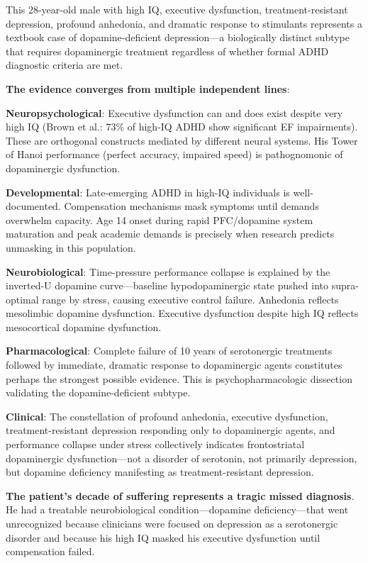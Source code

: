 This 28-year-old male with high IQ, executive dysfunction, treatment-resistant depression, profound anhedonia, and dramatic response to stimulants represents a textbook case of dopamine-deficient depression---a biologically distinct subtype that requires dopaminergic treatment regardless of whether formal ADHD diagnostic criteria are met.

\textbf{The evidence converges from multiple independent lines}:

\textbf{Neuropsychological}: Executive dysfunction can and does exist despite very high IQ (Brown et al.: 73\% of high-IQ ADHD show significant EF impairments). These are orthogonal constructs mediated by different neural systems. His Tower of Hanoi performance (perfect accuracy, impaired speed) is pathognomonic of dopaminergic dysfunction.

\textbf{Developmental}: Late-emerging ADHD in high-IQ individuals is well-documented. Compensation mechanisms mask symptoms until demands overwhelm capacity. Age 14 onset during rapid PFC/dopamine system maturation and peak academic demands is precisely when research predicts unmasking in this population.

\textbf{Neurobiological}: Time-pressure performance collapse is explained by the inverted-U dopamine curve---baseline hypodopaminergic state pushed into supra-optimal range by stress, causing executive control failure. Anhedonia reflects mesolimbic dopamine dysfunction. Executive dysfunction despite high IQ reflects mesocortical dopamine dysfunction.

\textbf{Pharmacological}: Complete failure of 10 years of serotonergic treatments followed by immediate, dramatic response to dopaminergic agents constitutes perhaps the strongest possible evidence. This is psychopharmacologic dissection validating the dopamine-deficient subtype.

\textbf{Clinical}: The constellation of profound anhedonia, executive dysfunction, treatment-resistant depression responding only to dopaminergic agents, and performance collapse under stress collectively indicates frontostriatal dopaminergic dysfunction---not a disorder of serotonin, not primarily depression, but dopamine deficiency manifesting as treatment-resistant depression.

\textbf{The patient's decade of suffering represents a tragic missed diagnosis}. He had a treatable neurobiological condition---dopamine deficiency---that went unrecognized because clinicians were focused on depression as a serotonergic disorder and because his high IQ masked his executive dysfunction until compensation failed.

